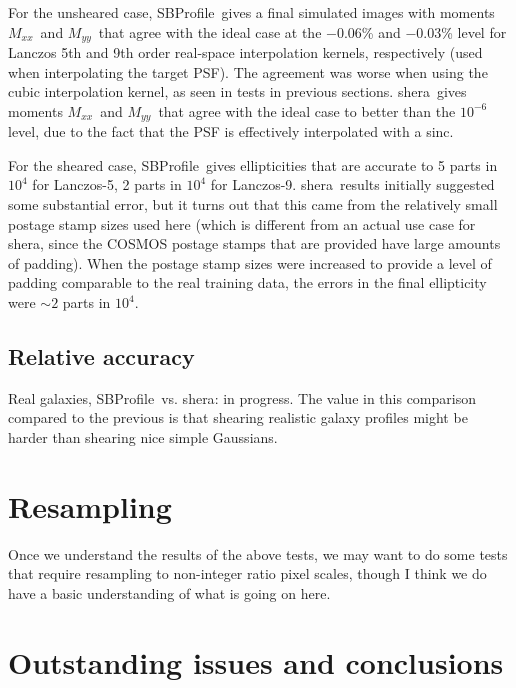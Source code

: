 \documentclass[preprint]{aastex}
\newcommand{\shera}{{\sc shera}}
\newcommand{\sbp}{SBProfile}
\newcommand{\mxx}{\ensuremath{M_{xx}}}
\newcommand{\myy}{\ensuremath{M_{yy}}}
\begin{document}
For the unsheared case, \sbp\ gives a final simulated images with moments \mxx\ and \myy\ that agree
with the ideal case at the $-0.06$\% and $-0.03$\% level for Lanczos
5th and 9th order real-space interpolation
kernels, respectively (used when interpolating the target PSF).  The agreement was worse when using
the cubic interpolation kernel, as seen in tests in previous sections.  \shera\ gives moments \mxx\
and \myy\ that agree with the ideal case to better than the $10^{-6}$ level, due to the fact that
the PSF is effectively interpolated with a sinc.

For the sheared case, \sbp\ gives ellipticities that are accurate to 5 parts in $10^4$ for
Lanczos-5, 2 parts in $10^4$ for Lanczos-9.  \shera\ results initially suggested some substantial
error, but it turns out that this came from the relatively small postage stamp sizes used here
(which is different from an actual use case for \shera, since the COSMOS postage stamps that are
provided have large amounts of padding).  When the postage stamp sizes were increased to provide a
level of padding comparable to the real training data, the errors in
the final ellipticity were $\sim2$ parts in $10^4$.

\subsection{Relative accuracy}

Real galaxies, \sbp\ vs. \shera: in progress.  The value in this comparison compared to the previous
is that shearing realistic galaxy profiles might be harder than shearing nice simple Gaussians.

\section{Resampling}

Once we understand the results of the above tests, we may want to do some tests that 
require resampling to non-integer ratio pixel scales, though I think we do have a basic
understanding of what is going on here.

\section{Outstanding issues and conclusions}
\end{document}

